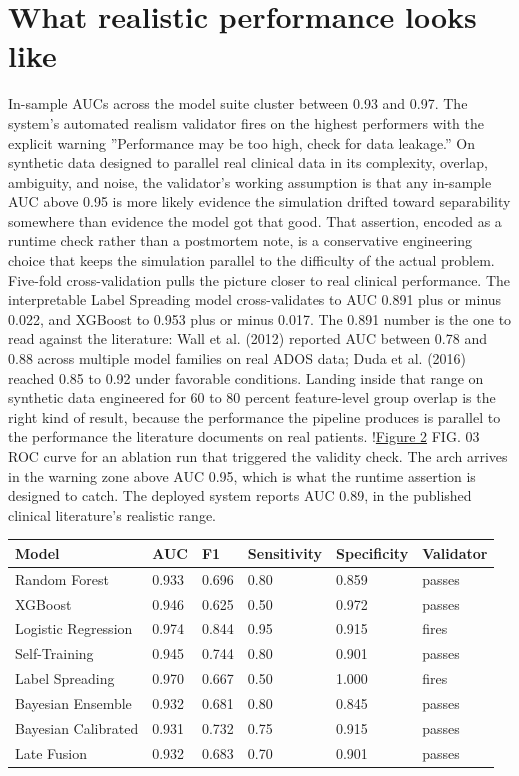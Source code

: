 \documentclass{obelus-preprint}
\begin{document}
\section{What realistic performance looks like}
In-sample AUCs across the model suite cluster between 0.93 and 0.97. The system's automated realism validator fires on the highest performers with the explicit warning ''Performance may be too high, check for data leakage.'' On synthetic data designed to parallel real clinical data in its complexity, overlap, ambiguity, and noise, the validator's working assumption is that any in-sample AUC above 0.95 is more likely evidence the simulation drifted toward separability somewhere than evidence the model got that good. That assertion, encoded as a runtime check rather than a postmortem note, is a conservative engineering choice that keeps the simulation parallel to the difficulty of the actual problem.
Five-fold cross-validation pulls the picture closer to real clinical performance. The interpretable Label Spreading model cross-validates to AUC 0.891 plus or minus 0.022, and XGBoost to 0.953 plus or minus 0.017. The 0.891 number is the one to read against the literature: Wall et al. (2012) reported AUC between 0.78 and 0.88 across multiple model families on real ADOS data; Duda et al. (2016) reached 0.85 to 0.92 under favorable conditions. Landing inside that range on synthetic data engineered for 60 to 80 percent feature-level group overlap is the right kind of result, because the performance the pipeline produces is parallel to the performance the literature documents on real patients.
!\href{fig_2.svg}{Figure 2}
FIG. 03 ROC curve for an ablation run that triggered the validity check. The arch arrives in the warning zone above AUC 0.95, which is what the runtime assertion is designed to catch. The deployed system reports AUC 0.89, in the published clinical literature's realistic range.
\begin{center}
\begin{tabular}{llllll}
\toprule
\textbf{Model} & \textbf{AUC} & \textbf{F1} & \textbf{Sensitivity} & \textbf{Specificity} & \textbf{Validator} \\
\midrule
Random Forest & 0.933 & 0.696 & 0.80 & 0.859 & passes \\
XGBoost & 0.946 & 0.625 & 0.50 & 0.972 & passes \\
Logistic Regression & 0.974 & 0.844 & 0.95 & 0.915 & fires \\
Self-Training & 0.945 & 0.744 & 0.80 & 0.901 & passes \\
Label Spreading & 0.970 & 0.667 & 0.50 & 1.000 & fires \\
Bayesian Ensemble & 0.932 & 0.681 & 0.80 & 0.845 & passes \\
Bayesian Calibrated & 0.931 & 0.732 & 0.75 & 0.915 & passes \\
Late Fusion & 0.932 & 0.683 & 0.70 & 0.901 & passes \\
\bottomrule
\end{tabular}
\end{center}
\end{document}
